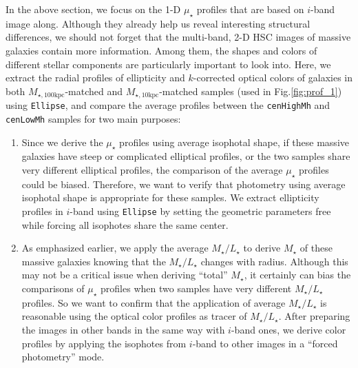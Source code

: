 \documentclass{emulateapj}
\def\rbcg{\texttt{cenHighMh}}
\def\nbcg{\texttt{cenLowMh}}
\def\mstar{{$M_{\star}$}}
\def\minn{{$M_{\star,10\mathrm{kpc}}$}}
\def\mtot{{$M_{\star,100\mathrm{kpc}}$}}
\def\m2l{{$M_{\star}/L_{\star}$}}
\def\mden{{$\mu_{\star}$}}
\newcommand{\update}[1]{\textcolor{Bittersweet}{#1}}
\begin{document}
\begin{CJK*}{UTF8}{gbsn}
    \update{
    In the above section, we focus on the 1-D \mden{} profiles that are based on 
    $i$-band image along. 
    Although they already help us reveal interesting structural differences, we 
    should not forget that the multi-band, 2-D HSC images of massive galaxies 
    contain more information. 
    Among them, the shapes and colors of different stellar components are particularly 
    important to look into.
    Here, we extract the radial profiles of ellipticity and $k$-corrected optical colors
    of galaxies in both \mtot{}-matched and \minn{}-matched samples (used in 
    Fig.\ref{fig:prof_1}) using \texttt{Ellipse}, and compare the average profiles between
    the \rbcg{} and \nbcg{} samples for two main purposes:}
    
    \begin{enumerate}
        \item \update{Since we derive the \mden{} profiles using average isophotal 
            shape, if these massive galaxies have steep or complicated elliptical 
            profiles, or the two samples share very different elliptical profiles, 
            the comparison of the average \mden{} profiles could be biased.
            Therefore, we want to verify that photometry using average isophotal 
            shape is appropriate for these samples. 
            We extract ellipticity profiles in $i$-band using \texttt{Ellipse} by 
            setting the geometric parameters free while forcing all isophotes share 
            the same center.}
        \item \update{As emphasized earlier, we apply the average \m2l{} to derive 
            \mstar{} of these massive galaxies knowing that the \m2l{} changes with 
            radius.  Although this may not be a critical issue when deriving ``total''
            \mstar{}, it certainly can bias the comparisons of \mden{} profiles when 
            two samples have very different \m2l{} profiles. 
            So we want to confirm that the application of average \m2l{} is reasonable
            using the optical color profiles as tracer of \m2l{}.  
            After preparing the images in other bands in the same way with $i$-band 
            ones, we derive color profiles by applying the isophotes from $i$-band 
            to other images in a ``forced photometry'' mode.}
    \end{enumerate}


\end{CJK*}
\end{document}
